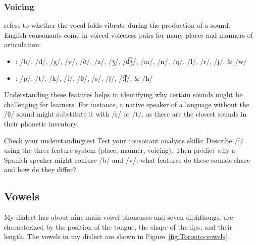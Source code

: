 \subsubsection{Voicing}

 refers to whether the vocal folds vibrate during the production of a sound. English consonants come in voiced-voiceless pairs for many places and manners of articulation:

\begin{itemize}[noitemsep]
    \item {}: /b/, /d/, /g/, /v/, /ð/, /z/, /ʒ/, /d͡ʒ/, /m/, /n/, /ŋ/, /l/, /r/, /j/, \& /w/
    \item {}: /p/, /t/, /k/, /f/, /θ/, /s/, /ʃ/, /t͡ʃ/, \& /h/
\end{itemize}

Understanding these features helps in identifying why certain sounds might be challenging for learners. For instance, a native speaker of a language without the /θ/ sound might substitute it with /s/ or /t/, as these are the closest sounds in their phonetic inventory.

\begin{tblsframedsymbol}{Check your understanding}{test}
Test your consonant analysis skills: Describe /f/ using the three-feature system (place, manner, voicing). Then predict why a Spanish speaker might confuse /b/ and /v/: what features do these sounds share and how do they differ?
\end{tblsframedsymbol}

\subsection{Vowels}

My dialect has about nine main vowel phonemes and seven diphthongs.  are characterized by the position of the tongue, the shape of the lips, and their length. The vowels in my dialect are shown in Figure~\ref{fig:Toronto-vowels}.

